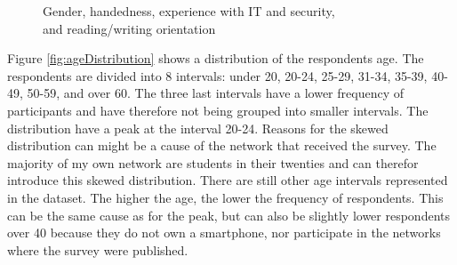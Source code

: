     \begin{figure}[H]
      \centering
      \captionsetup{justification=centering}
      \hspace{0.5cm}
      \caption{Gender, handedness, experience with IT and security,\\ and reading/writing orientation}
      \label{fig:respondentsBasics}
    \end{figure}

    Figure \ref{fig:ageDistribution} shows a distribution of the respondents age. The respondents are divided into 8 intervals: under 20, 20-24, 25-29, 31-34, 35-39, 40-49, 50-59, and over 60. The three last intervals have a lower frequency of participants and have therefore not being grouped into smaller intervals. The distribution have a peak at the interval 20-24. Reasons for the skewed distribution can might be a cause of the network that received the survey. The majority of my own network are students in their twenties and can therefor introduce this skewed distribution. There are still other age intervals represented in the dataset. The higher the age, the lower the frequency of respondents. This can be the same cause as for the peak, but can also be slightly lower respondents over 40 because they do not own a smartphone, nor participate in the networks where the survey were published.

